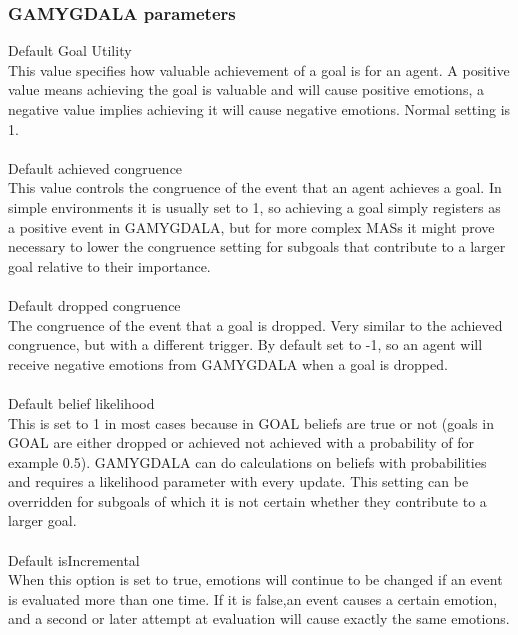 \documentclass[11pt]{article}
\begin{document}
\subsubsection*{GAMYGDALA parameters}
Default Goal Utility\\
This value specifies how valuable achievement of a goal is for an agent. A positive value means achieving the goal is valuable and will cause positive emotions, a negative value implies achieving it will cause negative emotions. Normal setting is 1.\\
\\
Default achieved congruence\\
This value controls the congruence of the event that an agent achieves a goal. In simple environments it is usually set to 1, so achieving a goal simply registers as a positive event in GAMYGDALA, but for more complex MASs it might prove necessary to lower the congruence setting for subgoals that contribute to a larger goal relative to their importance.\\
\\
Default dropped congruence\\
The congruence of the event that a goal is dropped. Very similar to the achieved congruence, but with a different trigger. By default set to -1, so an agent will receive negative emotions from GAMYGDALA when a goal is dropped.\\
\\
Default belief likelihood\\
This is set to 1 in most cases because in GOAL beliefs are true or not (goals in GOAL are either dropped or achieved not achieved with a probability of for example 0.5). GAMYGDALA can do calculations on beliefs with probabilities and requires a likelihood parameter with every update. This setting can be overridden for subgoals of which it is not certain whether they contribute to a larger goal.\\
\\
Default isIncremental\\
When this option is set to true, emotions will continue to be changed if an event is evaluated more than one time. If it is false,an event causes a certain emotion, and a second or later attempt at evaluation will cause exactly the same emotions.
\\
\end{document}

